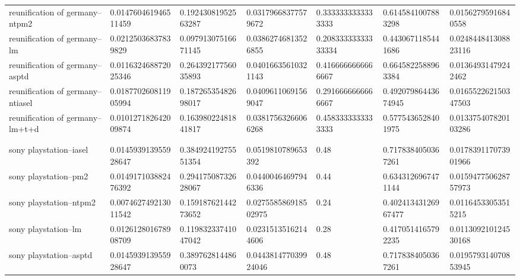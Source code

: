 \begin{table}[h]
\begin{tabular}{lllllll}
reunification of germany--ntpm2       & 0.014760461946511459  & 0.19243081952563287 & 0.03179668377579672  & 0.3333333333333333  & 0.6145841007883298  & 0.01562795916840558   \\
reunification of germany--lm          & 0.02125036837839829   & 0.09791307516671145 & 0.03862746813526855  & 0.20833333333333334 & 0.4430671185441686  & 0.024844841308823116  \\
reunification of germany--asptd       & 0.011632468872025346  & 0.26439217756035893 & 0.04016635610321143  & 0.4166666666666667  & 0.6645822588963384  & 0.01364931479242462   \\
reunification of germany--ntiasel     & 0.018770260811905994  & 0.18726535482698017 & 0.04096110691569047  & 0.2916666666666667  & 0.49207986443674945 & 0.016552262150347503  \\
reunification of germany--lm+t+d      & 0.010127182642009874  & 0.16398022481841817 & 0.03817563266066268  & 0.4583333333333333  & 0.5775436528401975  & 0.013375407820103286  \\
                                      &                       &                     &                      &                     &                     &                       \\
                                      &                       &                     &                      &                     &                     &                       \\
sony playstation--iasel               & 0.014593913955928647  & 0.38492419275551354 & 0.0519810789653392   & 0.48                & 0.7178384050367261  & 0.017839117073901966  \\
sony playstation--pm2                 & 0.014917103882476392  & 0.29417508732628067 & 0.04400464697946336  & 0.44                & 0.6343126967471144  & 0.015947750628757973  \\
sony playstation--ntpm2               & 0.007462749213011542  & 0.15918762144273652 & 0.027558586918502975 & 0.24                & 0.40241343126967477 & 0.01164533053515215   \\
sony playstation--lm                  & 0.012612801678908709  & 0.11983233741047042 & 0.02315135162144606  & 0.28                & 0.4170514165792235  & 0.011309210124530168  \\
sony playstation--asptd               & 0.014593913955928647  & 0.3897628144860073  & 0.044381477039924046 & 0.48                & 0.7178384050367261  & 0.019579314070853945  \\

\end{tabular}
\end{table}

